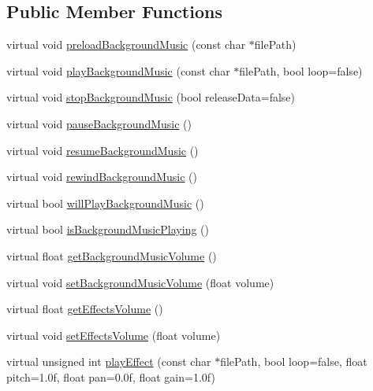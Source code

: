 \subsection*{Public Member Functions}
\begin{DoxyCompactItemize}
\item 
virtual void \hyperlink{classCocosDenshion_1_1SimpleAudioEngine_a7d0737ff7a321c11ed9e3467e41f1cf9}{preload\+Background\+Music} (const char $\ast$file\+Path)
\item 
virtual void \hyperlink{classCocosDenshion_1_1SimpleAudioEngine_a579246d2298b943adf49a2c4faaf25ea}{play\+Background\+Music} (const char $\ast$file\+Path, bool loop=false)
\item 
virtual void \hyperlink{classCocosDenshion_1_1SimpleAudioEngine_a3c67d3e233924b25d67bc198aaa4553c}{stop\+Background\+Music} (bool release\+Data=false)
\item 
virtual void \hyperlink{classCocosDenshion_1_1SimpleAudioEngine_addf0536bfbb9ad38668108ee289ccaf6}{pause\+Background\+Music} ()
\item 
virtual void \hyperlink{classCocosDenshion_1_1SimpleAudioEngine_a565f2d3e28072b6a7173064b797767c0}{resume\+Background\+Music} ()
\item 
virtual void \hyperlink{classCocosDenshion_1_1SimpleAudioEngine_ab91dfde414f3ef20ccd891e59ba5a67d}{rewind\+Background\+Music} ()
\item 
virtual bool \hyperlink{classCocosDenshion_1_1SimpleAudioEngine_af2a5eb0c4a7127c62a0c61dfd285d076}{will\+Play\+Background\+Music} ()
\item 
virtual bool \hyperlink{classCocosDenshion_1_1SimpleAudioEngine_a657a39bd7259565a4571699c3e6d56fd}{is\+Background\+Music\+Playing} ()
\item 
virtual float \hyperlink{classCocosDenshion_1_1SimpleAudioEngine_a393d453216f76884e92cf010ba926330}{get\+Background\+Music\+Volume} ()
\item 
virtual void \hyperlink{classCocosDenshion_1_1SimpleAudioEngine_a0a62f8945d7b81dbf80bae2331fa8cb3}{set\+Background\+Music\+Volume} (float volume)
\item 
virtual float \hyperlink{classCocosDenshion_1_1SimpleAudioEngine_a9bf72f162462408313d4e0085337e4ef}{get\+Effects\+Volume} ()
\item 
virtual void \hyperlink{classCocosDenshion_1_1SimpleAudioEngine_a792bcbbf7da23ef90e38aaee576914e7}{set\+Effects\+Volume} (float volume)
\item 
virtual unsigned int \hyperlink{classCocosDenshion_1_1SimpleAudioEngine_afdd4400a377a350f728b69fae870db20}{play\+Effect} (const char $\ast$file\+Path, bool loop=false, float pitch=1.\+0f, float pan=0.\+0f, float gain=1.\+0f)

\end{DoxyCompactItemize}
